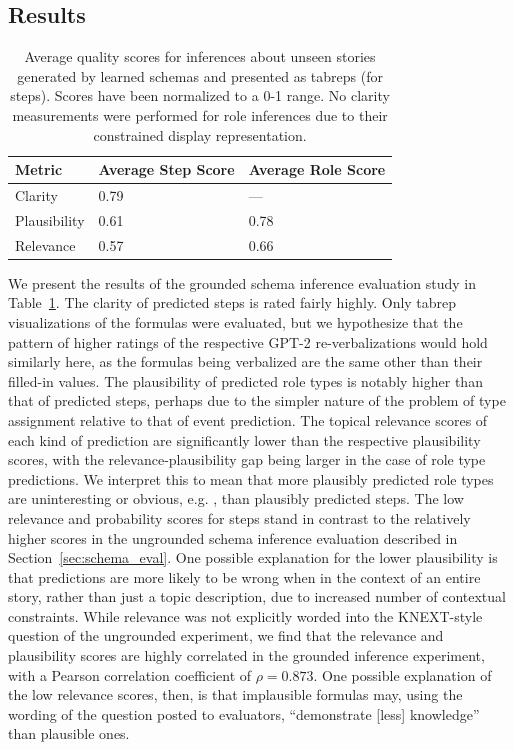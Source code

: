 \subsection{Results}
\begin{table}[ht]
    \centering
    \begin{tabular}{l|l|l}
       \textbf{Metric} & \textbf{Average Step Score} & \textbf{Average Role Score} \\
       \hline
       Clarity & 0.79 & --- \\
       Plausibility & 0.61 & 0.78 \\
       Relevance & 0.57 & 0.66
    \end{tabular}
    \caption{Average quality scores for inferences about unseen stories generated by learned schemas and presented as tabreps (for steps). Scores have been normalized to a 0-1 range. No clarity measurements were performed for role inferences due to their constrained display representation.}
    \label{tab:inf_results}
\end{table}

We present the results of the grounded schema inference evaluation study in Table~\ref{tab:inf_results}. The clarity of predicted steps is rated fairly highly. Only tabrep visualizations of the formulas were evaluated, but we hypothesize that the pattern of higher ratings of the respective GPT-2 re-verbalizations would hold similarly here, as the formulas being verbalized are the same other than their filled-in values. The plausibility of predicted role types is notably higher than that of predicted steps, perhaps due to the simpler nature of the problem of type assignment relative to that of event prediction. The topical relevance scores of each kind of prediction are significantly lower than the respective plausibility scores, with the relevance-plausibility gap being larger in the case of role type predictions. We interpret this to mean that more plausibly predicted role types are uninteresting or obvious, e.g. , than plausibly predicted steps. 
The low relevance and probability scores for steps stand in contrast to the relatively higher scores in the ungrounded schema inference evaluation described in Section~\ref{sec:schema_eval}. One possible explanation for the lower plausibility is that predictions are more likely to be wrong when in the context of an entire story, rather than just a topic description, due to increased number of contextual constraints. While relevance was not explicitly worded into the KNEXT-style question of the ungrounded experiment, we find that the relevance and plausibility scores are highly correlated in the grounded inference experiment, with a Pearson correlation coefficient of $\rho = 0.873$. One possible explanation of the low relevance scores, then, is that implausible formulas may, using the wording of the question posted to evaluators, ``demonstrate [less] knowledge'' than plausible ones.

